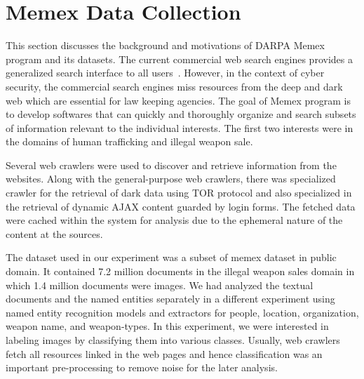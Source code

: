 \section{Memex Data Collection}
\label{sec:memex-data}
This section discusses the background and motivations of DARPA Memex program and its datasets. The current commercial web search engines provides a generalized search interface to all users~\cite{}. However, in the context of cyber security, the commercial search engines miss resources from the deep and dark web which are essential for law keeping agencies. The goal of Memex program is to develop softwares that can quickly and thoroughly organize and search subsets of information relevant to the individual interests. The first two interests were in the domains of human trafficking and illegal weapon sale.

Several web crawlers were used to discover and retrieve information from the websites.
Along with the general-purpose web crawlers, there was specialized crawler for the retrieval of dark data using TOR protocol \cite{} and also specialized in the retrieval of dynamic AJAX content guarded by login forms. The fetched data were cached within the system for analysis due to the ephemeral nature of the content at the sources.

The dataset used in our experiment was a subset of memex dataset in public domain. It contained 7.2 million documents in the illegal weapon sales domain in which 1.4 million documents were images. We had analyzed the textual documents and the named entities separately in a different experiment using named entity recognition models and extractors for people, location, organization, weapon name, and weapon-types. In this experiment, we were interested in labeling images by classifying them into various classes. Usually, web crawlers fetch all resources linked in the web pages and hence classification was an important pre-processing to remove noise for the later analysis.